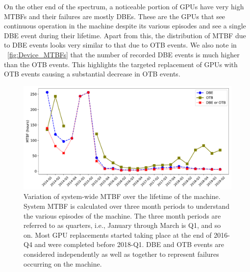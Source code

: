 On the other end of the spectrum, a noticeable portion of GPUs have very high
MTBFs and their failures are mostly DBEs. These are the GPUs that see continuous operation in the machine 
despite its various episodes and see a single DBE event during their lifetime.
Apart from this, the distribution of MTBF due to DBE events looks very similar to that due 
to OTB events. We also note in ~\ref{fig:Device_MTBFs} that the number of recorded 
DBE events is much higher than the OTB events. This highlights the targeted replacement of GPUs 
with OTB events causing a substantial decrease in OTB events.  



\begin{figure}[bt]
  \begin{center}
    \includegraphics[trim={0 1em 0 1em},clip,width=\columnwidth]{figs/MTBF_quaterly_sys.pdf}
  \end{center}
  \caption{Variation of system-wide MTBF over the lifetime of the machine. System MTBF is calculated over 
three month periods to understand the various episodes of the machine. The three month periods are 
referred to as quarters, i.e., January through March is Q1, and so on. Most GPU replacements started taking 
place at the end of 2016-Q4 and were completed before 2018-Q1. DBE and OTB events are 
considered independently as well as together to represent failures occurring on the machine.}
  \label{fig:MTBF_sys}
\end{figure}


